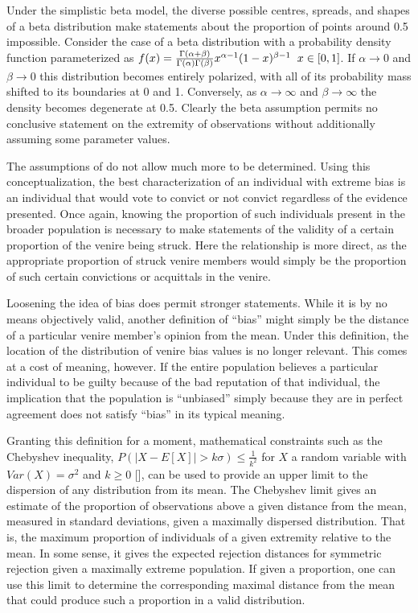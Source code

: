 Under the simplistic beta model, the diverse possible centres, spreads, and shapes of a beta distribution make statements about
the proportion of points around 0.5 impossible. Consider the case of a beta distribution with a probability density function
parameterized as $f(x) = \frac{\Gamma (\alpha + \beta)}{\Gamma (\alpha) \Gamma (\beta)} x^{\alpha-1} (1-x)^{\beta-1}
\hspace{0.2cm} x \in [0,1]$. If $\alpha \rightarrow 0$ and $\beta \rightarrow 0$ this distribution becomes entirely polarized,
with all of its probability mass shifted to its boundaries at 0 and 1. Conversely, as  $\alpha \rightarrow \infty$ and $\beta
\rightarrow \infty$ the density becomes degenerate at 0.5. Clearly the
beta assumption permits no conclusive statement on the extremity of
observations without additionally assuming some parameter values.

The assumptions of \cite{flanagan2015} do not allow much more to be determined. Using this conceptualization, the best
characterization of an individual with extreme bias is an individual that would vote to convict or not convict regardless of the
evidence presented. Once again, knowing the proportion of such individuals present in the broader population is necessary to make
statements of the validity of a certain proportion of the venire being struck. Here the relationship is more direct, as the
appropriate proportion of struck venire members would simply be the proportion of such certain convictions or acquittals in the
venire.

Loosening the idea of bias does permit stronger statements. While it is by no means objectively valid, another definition of
``bias'' might simply be the distance of a particular venire member's opinion from the mean. Under this definition, the location
of the distribution of venire bias values is no longer relevant. This comes at a cost of meaning, however. If the entire population
believes a particular individual to be guilty because of the bad reputation of that individual, the implication that the
population is ``unbiased'' simply because they are in perfect agreement does not satisfy ``bias'' in its typical meaning.

Granting this definition for a moment, mathematical constraints such as the Chebyshev inequality, $P(|X - E[X]| > k\sigma) \leq
\frac{1}{k^2}$ for $X$ a random variable with $Var(X) = \sigma^2$ and $k \geq 0$ [\cite{chebyshev}], can be used to
provide an upper limit to the dispersion of any distribution from its mean. The Chebyshev limit gives an estimate of the
proportion of observations above a given distance from the mean, measured in standard deviations, given a maximally dispersed
distribution. That is, the maximum proportion of individuals of a given extremity relative to the mean. In some sense, it gives
the expected rejection distances for symmetric rejection given a maximally extreme population. If given a proportion, one can use
this limit to determine the corresponding maximal distance from the mean that could produce such a proportion in a valid
distribution.

